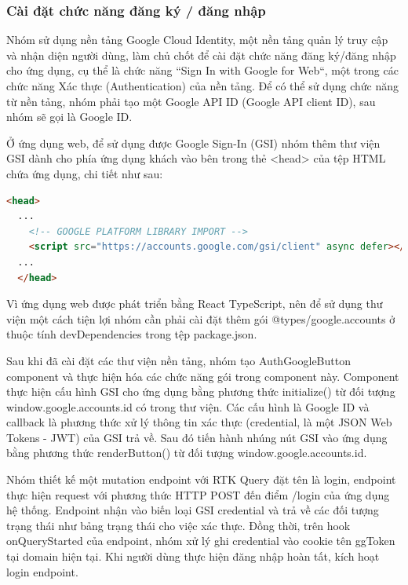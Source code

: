 \subsubsection{Cài đặt chức năng đăng ký / đăng nhập}

\tab Nhóm sử dụng nền tảng Google Cloud Identity, một nền tảng quản lý truy cập và nhận diện người dùng, làm chủ chốt để cài đặt chức năng đăng ký/đăng nhập cho ứng dụng, cụ thể là chức năng “Sign In with Google for Web“, một trong các chức năng Xác thực (Authentication) của nền tảng. Để có thể sử dụng chức năng từ nền tảng, nhóm phải tạo một Google API ID (Google API client ID), sau nhóm sẽ gọi là Google ID.
\par

Ở ứng dụng web, để sử dụng được Google Sign-In (GSI) nhóm thêm thư viện GSI dành cho phía ứng dụng khách vào bên trong thẻ <head> của tệp HTML chứa ứng dụng, chi tiết như sau:
\par

\lstset{style=mystyle}
\begin{lstlisting}[language=HTML, caption=Thêm thư viện GSI vào ứng dụng]
  <head>
  ...
    <!-- GOOGLE PLATFORM LIBRARY IMPORT -->
    <script src="https://accounts.google.com/gsi/client" async defer></script>
  ...
  </head>
\end{lstlisting}

Vì ứng dụng web được phát triển bằng React TypeScript, nên để sử dụng thư viện một cách tiện lợi nhóm cần phải cài đặt thêm gói @types/google.accounts ở thuộc tính devDependencies trong tệp package.json.

Sau khi đã cài đặt các thư viện nền tảng, nhóm tạo AuthGoogleButton component và thực hiện hóa các chức năng gói trong component này. Component thực hiện cấu hình GSI cho ứng dụng bằng phương thức initialize() từ đối tượng window.google.accounts.id có trong thư viện. Các cấu hình là Google ID và callback là phương thức xử lý thông tin xác thực (credential, là một JSON Web Tokens - JWT) của GSI trả về. Sau đó tiến hành nhúng nút GSI vào ứng dụng bằng phương thức renderButton() từ đối tượng window.google.accounts.id.

Nhóm thiết kế một mutation endpoint với RTK Query đặt tên là login, endpoint thực hiện request với phương thức HTTP POST đến điểm /login của ứng dụng hệ thống. Endpoint nhận vào biến loại GSI credential và trả về các đối tượng trạng thái như bảng trạng thái cho việc xác thực. Đồng thời, trên hook onQueryStarted của endpoint, nhóm xử lý ghi credential vào cookie tên ggToken tại domain hiện tại. Khi người dùng thực hiện đăng nhập hoàn tất, kích hoạt login endpoint.

